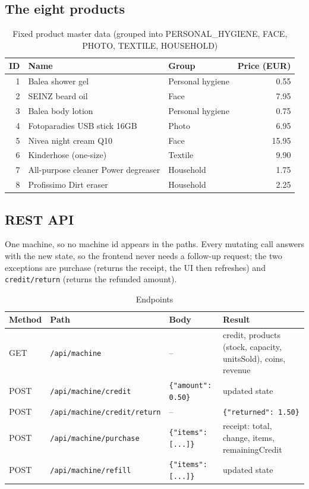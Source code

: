 \documentclass[11pt,a4paper]{article}
\newcommand{\code}[1]{\texttt{\small #1}}
\begin{document}
\subsection{The eight products}

\begin{table}[h]
\centering
\small
\begin{tabular}{@{}rllr@{}}
\toprule
\textbf{ID} & \textbf{Name} & \textbf{Group} & \textbf{Price (EUR)} \\
\midrule
1 & Balea shower gel & Personal hygiene & 0.55 \\
2 & SEINZ beard oil & Face & 7.95 \\
3 & Balea body lotion & Personal hygiene & 0.75 \\
4 & Fotoparadies USB stick 16GB & Photo & 6.95 \\
5 & Nivea night cream Q10 & Face & 15.95 \\
6 & Kinderhose (one-size) & Textile & 9.90 \\
7 & All-purpose cleaner Power degreaser & Household & 1.75 \\
8 & Profissimo Dirt eraser & Household & 2.25 \\
\bottomrule
\end{tabular}
\caption{Fixed product master data (grouped into PERSONAL\_HYGIENE, FACE, PHOTO, TEXTILE, HOUSEHOLD)}
\end{table}

\subsection{REST API}

One machine, so no machine id appears in the paths. Every mutating call answers
with the new state, so the frontend never needs a follow-up request; the two
exceptions are purchase (returns the receipt, the UI then refreshes) and
\code{credit/return} (returns the refunded amount).

\begin{table}[h]
\centering
\small
\begin{tabular}{@{}llp{3.2cm}p{5.6cm}@{}}
\toprule
\textbf{Method} & \textbf{Path} & \textbf{Body} & \textbf{Result} \\
\midrule
GET & \code{/api/machine} & -- & credit, products (stock, capacity, unitsSold), coins, revenue \\
POST & \code{/api/machine/credit} & \code{\{"amount": 0.50\}} & updated state \\
POST & \code{/api/machine/credit/return} & -- & \code{\{"returned": 1.50\}} \\
POST & \code{/api/machine/purchase} & \code{\{"items": [...]\}} & receipt: total, change, items, remainingCredit \\
POST & \code{/api/machine/refill} & \code{\{"items": [...]\}} & updated state \\
\bottomrule
\end{tabular}
\caption{Endpoints}
\end{table}
\end{document}
